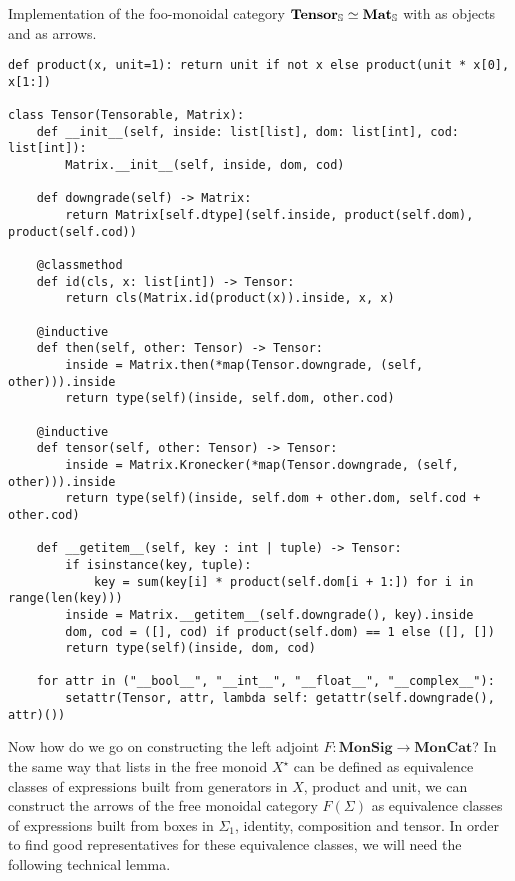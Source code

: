 \begin{python}\label{listing:tensor}
{\normalfont Implementation of the foo-monoidal category $\mathbf{Tensor}_\S \simeq \mathbf{Mat}_\S$ with  as objects and  as arrows.}

\begin{verbatim}
def product(x, unit=1): return unit if not x else product(unit * x[0], x[1:])

class Tensor(Tensorable, Matrix):
    def __init__(self, inside: list[list], dom: list[int], cod: list[int]):
        Matrix.__init__(self, inside, dom, cod)

    def downgrade(self) -> Matrix:
        return Matrix[self.dtype](self.inside, product(self.dom), product(self.cod))

    @classmethod
    def id(cls, x: list[int]) -> Tensor:
        return cls(Matrix.id(product(x)).inside, x, x)

    @inductive
    def then(self, other: Tensor) -> Tensor:
        inside = Matrix.then(*map(Tensor.downgrade, (self, other))).inside
        return type(self)(inside, self.dom, other.cod)

    @inductive
    def tensor(self, other: Tensor) -> Tensor:
        inside = Matrix.Kronecker(*map(Tensor.downgrade, (self, other))).inside
        return type(self)(inside, self.dom + other.dom, self.cod + other.cod)

    def __getitem__(self, key : int | tuple) -> Tensor:
        if isinstance(key, tuple):
            key = sum(key[i] * product(self.dom[i + 1:]) for i in range(len(key)))
        inside = Matrix.__getitem__(self.downgrade(), key).inside
        dom, cod = ([], cod) if product(self.dom) == 1 else ([], [])
        return type(self)(inside, dom, cod)

    for attr in ("__bool__", "__int__", "__float__", "__complex__"):
        setattr(Tensor, attr, lambda self: getattr(self.downgrade(), attr)())
\end{verbatim}
\end{python}

Now how do we go on constructing the left adjoint $F : \mathbf{MonSig} \to \mathbf{MonCat}$?
In the same way that lists in the free monoid $X^\star$ can be defined as equivalence classes of expressions built from generators in $X$, product and unit, we can construct the arrows of the free monoidal category $F(\Sigma)$ as equivalence classes of expressions built from boxes in $\Sigma_1$, identity, composition and tensor.
In order to find good representatives for these equivalence classes, we will need the following technical lemma.

